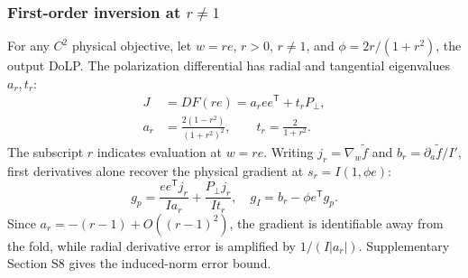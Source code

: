 \documentclass[10pt,a4paper]{article}
\begin{document}
\subsubsection{First-order inversion at $r\ne1$}
For any $C^2$ physical objective, let $w=re$, $r>0$, $r\ne1$, and $\phi=2r/(1+r^2)$, the output DoLP. The polarization differential has radial and tangential eigenvalues $a_r,t_r$:
\begin{equation}
 \begin{aligned}
 J&=DF(re)=a_ree^{\mathsf T}+t_rP_\perp,\\
 a_r&=\frac{2(1-r^2)}{(1+r^2)^2},\qquad t_r=\frac2{1+r^2}.
 \end{aligned}
 \label{eq:nearjacobian}
\end{equation}
The subscript $r$ indicates evaluation at $w=re$. Writing $j_r=\nabla_w\widetilde f$ and $b_r=\partial_a\widetilde f/I'$, first derivatives alone recover the physical gradient at $s_r=I(1,\phi e)$:
\begin{equation}
 g_p=\frac{ee^{\mathsf T}j_r}{Ia_r}+\frac{P_\perp j_r}{It_r},\quad
 g_I=b_r-\phi e^{\mathsf T}g_p.
 \label{eq:firstinverse}
\end{equation}
Since $a_r=-(r-1)+O((r-1)^2)$, the gradient is identifiable away from the fold, while radial derivative error is amplified by $1/(I|a_r|)$. Supplementary Section S8 gives the induced-norm error bound.
\end{document}
